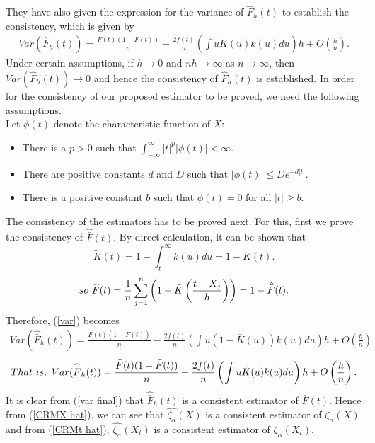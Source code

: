 \documentclass[11pt,reqno]{amsart}
\theoremstyle{tight}
\begin{document}
 They have also given the expression for the variance of $\hat{F}_h(t)$ to establish the consistency, which is given by
\begin{align}\label{var}
    Var(\widehat{F}_h(t))=\frac{F(t)(1-F(t))}{n}-\frac{2f(t)}{n}\left(\int u\tilde{K}(u)k(u)du\right)h+O\left(\frac{h}{n}\right).
\end{align}
Under certain assumptions, if $h\to 0$ and $nh \to \infty$ as $n \to \infty$, then $Var(\widehat{F}_h(t)) \to 0$ and hence the consistency of $\widehat{F}_h(t)$ is established. In order for the consistency of our proposed estimator to be proved, we need the following assumptions.\\
Let $\phi(t)$ denote the characteristic function of $X$:
\begin{itemize}
    \item[(A)] There is a $p >0$ such that $\int_{-\infty}^{\infty}|t|^{p}|\phi(t)|< \infty$.
    \item[(B)] There are positive constants $d$ and $D$ such that $|\phi(t)| \leq De^{-d|t|}$.
    \item[(C)] There is a positive constant $b$ such that $\phi(t)=0$ for all $|t| \geq b$.
\end{itemize}
    The consistency of the estimators has to be proved next. For this, first we prove the consistency of $\widehat{\bar{F}}(t)$. By direct calculation, it can be shown that
    \begin{equation*}
        \tilde{K}(t)=1-\int_t^\infty k(u)du=1-\bar{K}(t).
    \end{equation*}
    \begin{equation*}
    so \\\ \widehat{F}(t)=\frac{1}{n}\sum_{j=1}^{n}\left(1-\bar{K}\left(\frac{t-X_j}{h}\right)\right)=1-\hat{\bar{F}}(t).
    \end{equation*}
    Therefore, (\ref{var}) becomes
    \begin{align*}
     Var(\widehat{\bar{F}}_h(t))=\frac{\bar{F}(t)(1-\bar{F}(t))}{n}-\frac{2f(t)}{n}\left(\int u(1-\bar{K}(u))k(u)du\right)h+O\left(\frac{h}{n}\right)
    \end{align*}
    \begin{equation}\label{var final}
        That \\\ is,\\\\ \\\
        Var(\widehat{\bar{F}}_h(t))=\frac{\bar{F}(t)(1-\bar{F}(t))}{n}+\frac{2f(t)}{n}\left(\int u\bar{K}(u)k(u)du\right)h+O\left(\frac{h}{n}\right).
    \end{equation}
    It is clear from (\ref{var final}) that $\widehat{\bar{F}}_h(t)$ is a consistent estimator of $\bar{F}(t)$. Hence from (\ref{CRMX hat}), we can see that $\widehat  {\zeta_{\alpha}}(X)$ is a consistent estimator of $  {\zeta_{\alpha}}(X)$ and from (\ref{CRMt hat}), $\widehat  {\zeta_{\alpha}}(X_t)$ is a consistent estimator of $  {\zeta_{\alpha}}(X_t)$.\par
\end{document}
